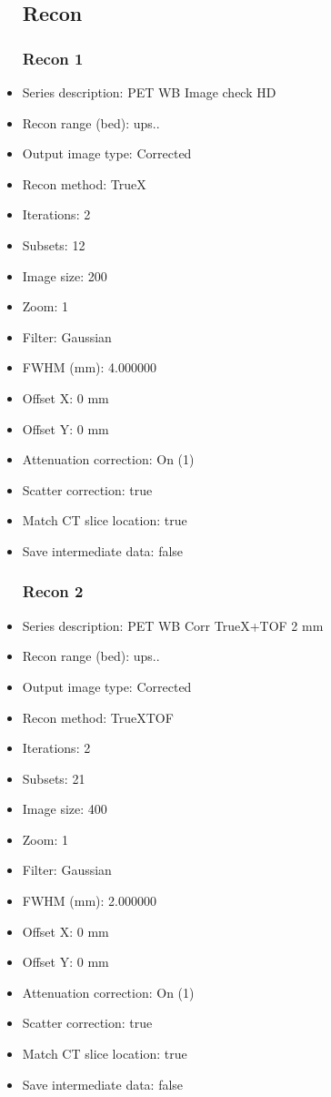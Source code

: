 \documentclass[12pt]{article}
\begin{document}
\begin{itemize}
\subsection{Recon}

\subsubsection{Recon 1}
\item Series description: PET WB Image check HD
\item Recon range (bed): ups..
\item Output image type: Corrected
\item Recon method: TrueX
\item Iterations: 2
\item Subsets: 12
\item Image size: 200
\item Zoom: 1
\item Filter: Gaussian
\item FWHM (mm): 4.000000
\item Offset X: 0 mm
\item Offset Y: 0 mm
\item Attenuation correction: On (1)
\item Scatter correction: true
\item Match CT slice location: true
\item Save intermediate data: false
\subsubsection{Recon 2}
\item Series description: PET WB Corr TrueX+TOF 2 mm
\item Recon range (bed): ups..
\item Output image type: Corrected
\item Recon method: TrueXTOF
\item Iterations: 2
\item Subsets: 21
\item Image size: 400
\item Zoom: 1
\item Filter: Gaussian
\item FWHM (mm): 2.000000
\item Offset X: 0 mm
\item Offset Y: 0 mm
\item Attenuation correction: On (1)
\item Scatter correction: true
\item Match CT slice location: true
\item Save intermediate data: false
\end{itemize}
\end{document}
